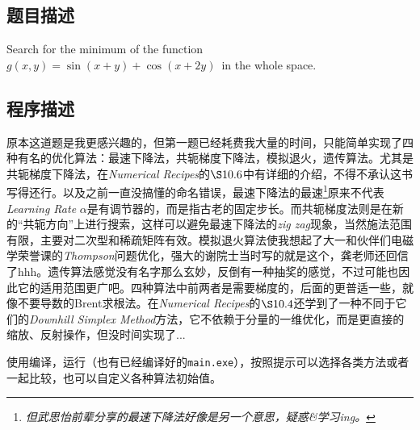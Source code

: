 \subsection{题目描述}
Search for the minimum of the function \boldmath\( g(x, y) = \sin(x + y) + \cos(x + 2y) \)\unboldmath\ in the whole space.
\subsection{程序描述}
原本这道题是我更感兴趣的，但第一题已经耗费我大量的时间，只能简单实现了四种有名的优化算法：最速下降法，共轭梯度下降法，模拟退火，遗传算法。尤其是共轭梯度下降法，在\textit{Numerical Recipes}的$\S 10.6$中有详细的介绍，不得不承认这书写得还行。以及之前一直没搞懂的命名错误，最速下降法的最速\footnote{\textit{但武思怡前辈分享的最速下降法好像是另一个意思，疑惑\&学习ing。}}原来不代表\textit{Learning Rate} \( \alpha\)是有调节器的，而是指古老的固定步长。而共轭梯度法则是在新的“共轭方向”上进行搜索，这样可以避免最速下降法的\textit{zig zag}现象，当然施法范围有限，主要对二次型和稀疏矩阵有效。模拟退火算法使我想起了大一和伙伴们电磁学荣誉课的\textit{Thompson}问题优化，强大的谢院士当时写的就是这个，龚老师还回信了hhh。遗传算法感觉没有名字那么玄妙，反倒有一种抽奖的感觉，不过可能也因此它的适用范围更广吧。四种算法中前两者是需要梯度的，后面的更普适一些，就像不要导数的Brent求根法。在\textit{Numerical Recipes}的$\S 10.4$还学到了一种不同于它们的\textit{Downhill Simplex Method}方法，它不依赖于分量的一维优化，而是更直接的缩放、反射操作，但没时间实现了...




使用编译，运行（也有已经编译好的\texttt{main.exe}），按照提示可以选择各类方法或者一起比较，也可以自定义各种算法初始值。
